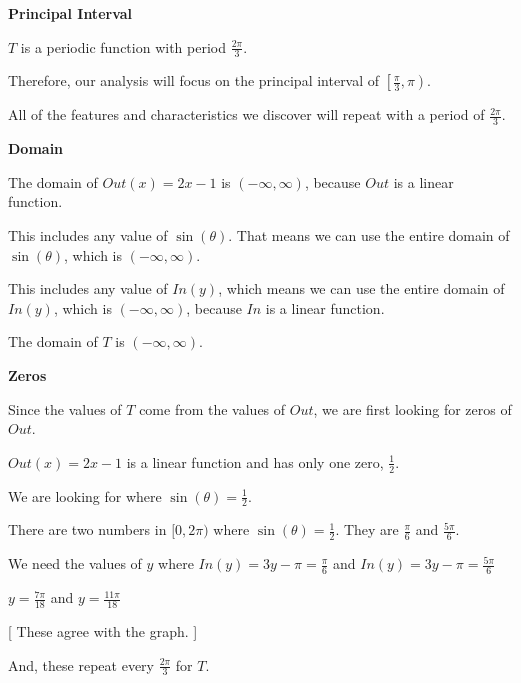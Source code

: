 \documentclass{ximera}
\begin{document}
\begin{observation} \textbf{\textcolor{-red!75}{Principal Interval}}

$T$ is a periodic function with period $\frac{2\pi}{3}$. 


Therefore, our analysis will focus on the principal interval of $\left[ \frac{\pi}{3}, \pi \right)$. 


All of the features and characteristics we discover will repeat with a period of $\frac{2\pi}{3}$.


\end{observation}









\textbf{\textcolor{blue!55!black}{Domain}}


The domain of $Out(x) = 2x - 1$ is $(-\infty, \infty)$, because $Out$ is a linear function.  

This includes any value of $\sin(\theta)$. That means we can use the entire domain of $\sin(\theta)$, which is $(-\infty, \infty)$.  


This includes any value of $In(y)$, which means we can use the entire domain of $In(y)$, which is $(-\infty, \infty)$, because $In$ is a linear function.  


The domain of $T$ is $(-\infty, \infty)$. 








\textbf{\textcolor{blue!55!black}{Zeros}}


Since the values of $T$ come from the values of $Out$, we are first looking for zeros of $Out$.  

$Out(x) = 2x - 1$ is a linear function and has only one zero, $\frac{1}{2}$. 

We are looking for where $\sin(\theta) = \frac{1}{2}$. 


There are two numbers in $[0, 2\pi)$ where $\sin(\theta) = \frac{1}{2}$.  They are $\frac{\pi}{6}$ and $\frac {5\pi}{6}$.

We need the values of $y$ where $In(y) = 3y - \pi = \frac{\pi}{6}$ and $In(y) = 3y - \pi = \frac{5\pi}{6}$

$y = \frac{7\pi}{18}$  and   $y = \frac{11\pi}{18}$

[ These agree with the graph. ]


And, these repeat every $\frac{2\pi}{3}$ for $T$.
\end{document}
